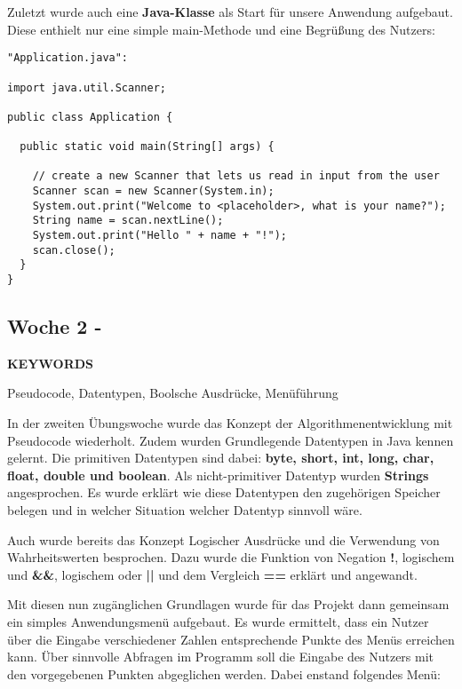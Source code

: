Zuletzt wurde auch eine \textbf{Java-Klasse} als Start für unsere Anwendung aufgebaut. Diese enthielt nur eine simple main-Methode und eine Begrüßung des Nutzers:

\begin{verbatim}
"Application.java":

import java.util.Scanner;

public class Application {

  public static void main(String[] args) {
 
    // create a new Scanner that lets us read in input from the user
    Scanner scan = new Scanner(System.in);
    System.out.print("Welcome to <placeholder>, what is your name?");
    String name = scan.nextLine();
    System.out.print("Hello " + name + "!");
    scan.close();
  }
}
\end{verbatim}
\subsection{Woche 2 - }
\label{ch:weektwo}
\line
\begin{center}
	\textbf{KEYWORDS}
	
	Pseudocode, Datentypen, Boolsche Ausdrücke, Menüführung
\end{center}
\line
In der zweiten Übungswoche wurde das Konzept der Algorithmenentwicklung mit Pseudocode wiederholt. Zudem wurden Grundlegende Datentypen in Java kennen gelernt. Die primitiven Datentypen sind dabei: \textbf{byte, short, int, long, char, float, double und boolean}. Als nicht-primitiver Datentyp wurden \textbf{Strings} angesprochen. Es wurde erklärt wie diese Datentypen den zugehörigen Speicher belegen und in welcher Situation welcher Datentyp sinnvoll wäre.

Auch wurde bereits das Konzept Logischer Ausdrücke und die Verwendung von Wahrheitswerten besprochen. Dazu wurde die Funktion von Negation \textbf{!}, logischem und \textbf{\&\&}, logischem oder \textbf{||} und dem Vergleich \textbf{==} erklärt und angewandt.

Mit diesen nun zugänglichen Grundlagen wurde für das Projekt dann gemeinsam ein simples Anwendungsmenü aufgebaut. Es wurde ermittelt, dass ein Nutzer über die Eingabe verschiedener Zahlen entsprechende Punkte des Menüs erreichen kann. Über sinnvolle Abfragen im Programm soll die Eingabe des Nutzers mit den vorgegebenen Punkten abgeglichen werden. Dabei enstand folgendes Menü:

